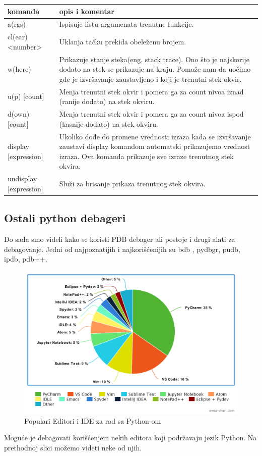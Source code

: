 \documentclass[a4paper]{article}
\begin{document}
\begin{center}
 \begin{tabular}{||p{3cm} p{7cm}||} 
 \hline
  komanda &      opis i komentar \\ [2.0ex] 
 \hline\hline
  a(rgs) & Ispisuje listu argumenata trenutne funkcije.  \\  [2ex]   
 \hline
 cl(ear) <number> & Uklanja tačku prekida obeleženu brojem.  \\ [2ex]
 \hline
 w(here) & Prikazuje stanje steka(eng. stack trace). Ono što je najskorije dodato na stek se prikazuje na kraju. Pomaže nam da uočimo gde je izvršavanje zaustavljeno i koji je trenutni stek okvir. \\ [2ex]
 \hline
 u(p) [count] & Menja trenutni stek okvir i pomera ga za count nivoa iznad (ranije dodato) na stek okviru.  \\ [2ex]
  \hline
 d(own) [count] & Menja trenutni stek okvir i pomera ga za count nivoa ispod (kasnije dodato) na stek okviru.  \\ [2ex] 
 \hline
  \hline
 display [expression] & Ukoliko dođe do promene vrednosti izraza kada se izvršavanje zaustavi display komandom automatski prikazujemo vrednost izraza. Ova komanda prikazuje sve izraze trenutnog stek okvira.\\ [2ex] 
 \hline
 \hline
 undisplay [expression] & Služi za brisanje prikaza trenutnog stek okvira.  \\ [2ex] 
 \hline
\end{tabular}
\end{center}

\subsection{Ostali python debageri}
Do sada smo videli kako se koristi PDB debager ali postoje i drugi alati za debagovanje. Jedni od najpoznatijih i najkorišćenijih su bdb \cite{bdbDocPyt}, pydbgr, pudb, ipdb, pdb++.
\begin{figure}[h!]
\begin{center}
\includegraphics[scale=0.25]{pie.png}
\end{center}
\caption{Populari Editori i IDE za rad sa Python-om}
\label{fig:pande}
\end{figure}
Moguće je debagovati korišćenjem nekih editora koji podržavaju jezik Python. Na prethodnoj slici možemo videti neke od njih.
\end{document}
